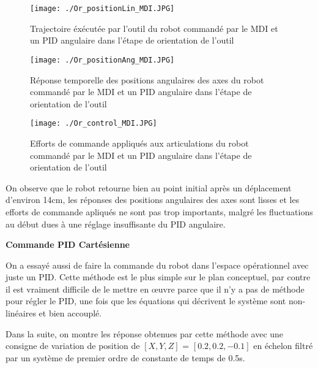 \begin{figure}[H]
	\begin{center}
		\captionsetup{justification=centering,margin=1cm}	
		\texttt{[image: ./Or\_positionLin\_MDI.JPG]}
		\caption{Trajectoire éxécutée par l'outil du robot commandé par le MDI et un PID angulaire dans l'étape de orientation de l'outil}
		\label{fig:Or_positionLin_MDI}
	\end{center}
\end{figure}

\begin{figure}[H]
	\begin{center}
		\captionsetup{justification=centering,margin=1cm}	
		\texttt{[image: ./Or\_positionAng\_MDI.JPG]}
		\caption{Réponse temporelle des positions angulaires des axes du robot commandé par le MDI et un PID angulaire dans l'étape de orientation de l'outil}
		\label{fig:Or_positionAng_MDI}
	\end{center}
\end{figure}
\newpage
\begin{figure}[H]
	\begin{center}
		\captionsetup{justification=centering,margin=1cm}	
		\texttt{[image: ./Or\_control\_MDI.JPG]}
		\caption{Efforts de commande appliqués aux articulations du robot commandé par le MDI et un PID angulaire dans l'étape de orientation de l'outil}
		\label{fig:Or_commande_MDI}
	\end{center}
\end{figure}

On observe que le robot retourne bien au point initial après un déplacement d'environ 14cm, les réponses des positions angulaires des axes sont lisses et les efforts de commande apliqués ne sont pas trop importants, malgré les fluctuations au début dues à une réglage insuffisante du PID angulaire.
\newline

\textbf{Commande PID Cartésienne}
\newline

On a essayé aussi de faire la commande du robot dans l'espace opérationnel avec juste un PID. Cette méthode est le plus simple sur le plan conceptuel, par contre il est vraiment difficile de le mettre en \oe{}uvre parce que il n'y a pas de méthode pour régler le PID, une fois que les équations qui décrivent le système sont non-linéaires et bien accouplé. 

Dans la suite, on montre les réponse obtenues par cette méthode avec une consigne de variation de position de $ \left[X,Y,Z\right] $ = $ \left[0.2, 0.2, -0.1\right] $ en échelon filtré par un système de premier ordre de constante de temps de 0.5s.

